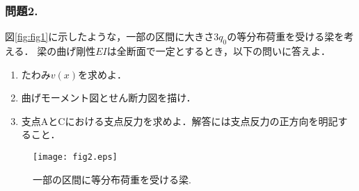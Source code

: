 \documentclass[10pt,a4j]{jarticle}
\begin{document}
\subsubsection*{問題2. }
図\ref{fig:fig1}に示したような，一部の区間に大きさ$3q_0$の等分布荷重を受ける梁を考える．
梁の曲げ剛性$EI$は全断面で一定とするとき，以下の問いに答えよ．
\begin{enumerate}
\item
	たわみ$v(x)$を求めよ．		
\item
	曲げモーメント図とせん断力図を描け．
\item
	支点AとCにおける支点反力を求めよ．解答には支点反力の正方向を明記すること．
\end{enumerate}
\begin{figure}[h]
	\begin{center}
	\texttt{[image: fig2.eps]} 
	\end{center}
	\vspace{-5mm}
	\caption{一部の区間に等分布荷重を受ける梁.}
	\label{fig:fig2}
\end{figure}
\end{document}
